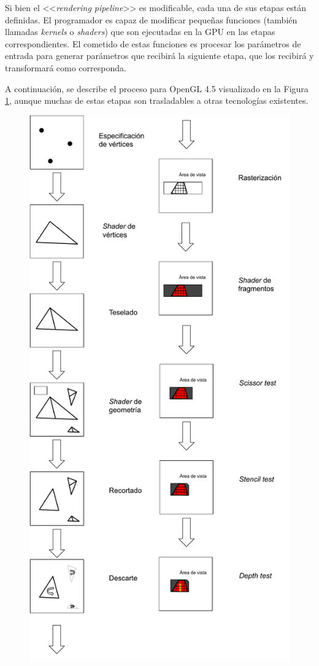 Si bien el <<\textit{rendering pipeline}>> es modificable, cada una de sus etapas están definidas.  El programador es capaz de modificar pequeñas funciones (también llamadas \textit{kernels} o \textit{shaders}) que son ejecutadas en la GPU en las etapas correspondientes. El cometido de estas funciones es procesar los parámetros de entrada para generar parámetros que recibirá la siguiente etapa, que los recibirá y transformará como corresponda.

A continuación, se describe el proceso para OpenGL 4.5 visualizado en la Figura \ref{img:pipelinegl}, aunque muchas de estas etapas son trasladables a otras tecnologías existentes.

\vspace{5mm}
\begin{figure}[htbp]
	\centering
	\includegraphics[width=0.55\linewidth]{assets/OpenGL}
	\label{img:pipelinegl}
\end{figure}

